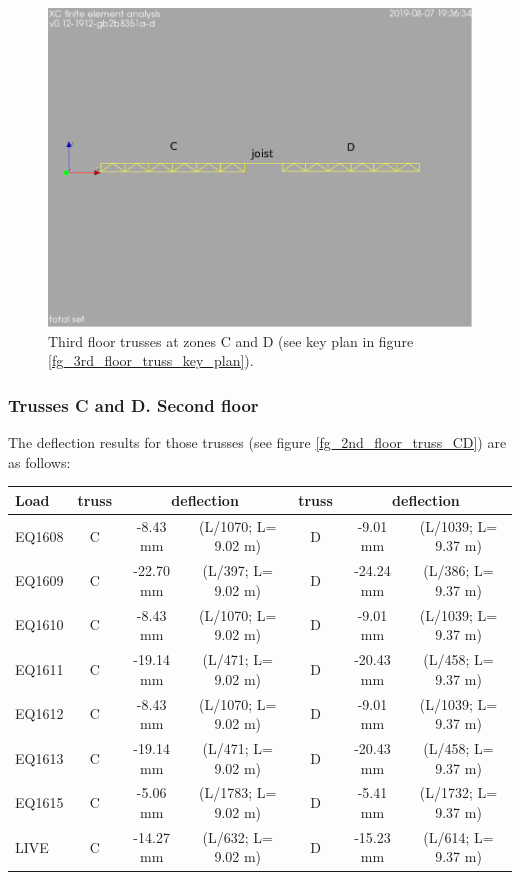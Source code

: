 \begin{figure}
  \begin{center}
  \includegraphics[width=120mm]{figures/trusses/floor_truss_CD}
  \end{center}
  \caption{Third floor trusses at zones C and D (see key plan in figure \ref{fg_3rd_floor_truss_key_plan}).}\label{fg_floor_truss_CD}
\end{figure}

\subsubsection{Trusses C and D. Second floor}
The deflection results for those trusses (see figure \ref{fg_2nd_floor_truss_CD}) are as follows:

\begin{center}
  \begin{scriptsize}
  \begin{tabular}{|l|c|c|c|c|c|c|}
    \hline
    \textbf{Load} & \textbf{truss} & \multicolumn{2}{c|}{\textbf{deflection}} & \textbf{truss} & \multicolumn{2}{c|}{\textbf{deflection}} \\
    \hline
EQ1608& C &-8.43  mm & (L/1070; L= 9.02 m) & D & -9.01  mm & (L/1039; L= 9.37 m)\\
EQ1609& C &-22.70  mm & (L/397; L= 9.02 m) & D & -24.24  mm & (L/386; L= 9.37 m)\\
EQ1610& C &-8.43  mm & (L/1070; L= 9.02 m) & D & -9.01  mm & (L/1039; L= 9.37 m)\\
EQ1611& C &-19.14  mm & (L/471; L= 9.02 m) & D & -20.43  mm & (L/458; L= 9.37 m)\\
EQ1612& C &-8.43  mm & (L/1070; L= 9.02 m) & D & -9.01  mm & (L/1039; L= 9.37 m)\\
EQ1613& C &-19.14  mm & (L/471; L= 9.02 m) & D & -20.43  mm & (L/458; L= 9.37 m)\\
EQ1615& C &-5.06  mm & (L/1783; L= 9.02 m) & D & -5.41  mm & (L/1732; L= 9.37 m)\\
LIVE& C &-14.27  mm & (L/632; L= 9.02 m) & D & -15.23  mm & (L/614; L= 9.37 m)\\
\hline
  \end{tabular}
  \end{scriptsize}
\end{center}

